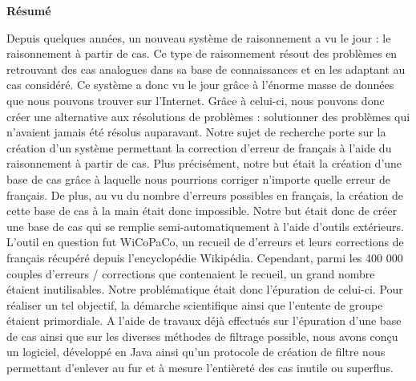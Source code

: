 \documentclass[11pt]{article}
\begin{document}
\cleardoublepage
\newpage
\strut
\thispagestyle{empty}
\newpage

\begin{center}
{\bfseries \huge R\'{e}sum\'{e}}
\end{center}
\vspace*{35mm}
Depuis quelques ann\'{e}es, un nouveau syst\`{e}me de raisonnement a vu le jour : le raisonnement \`{a} partir de cas. Ce type de raisonnement r\'{e}sout des probl\`{e}mes en retrouvant des cas analogues dans sa base de connaissances et en les adaptant au cas consid\'{e}r\'{e}. Ce syst\`{e}me a donc vu le jour gr\^{a}ce \`{a} l'\'{e}norme masse de donn\'{e}es que nous pouvons trouver sur l'Internet. Gr\^{a}ce \`{a} celui-ci, nous pouvons donc cr\'{e}er une alternative aux r\'{e}solutions de probl\`{e}mes : solutionner des probl\`{e}mes qui n'avaient jamais \'{e}t\'{e} r\'{e}solus auparavant. Notre sujet de recherche porte sur la cr\'{e}ation d'un syst\`{e}me permettant la correction d'erreur de fran\c{c}ais \`{a} l'aide du raisonnement \`{a} partir de cas. Plus pr\'{e}cis\'{e}ment, notre but \'{e}tait la cr\'{e}ation d'une base de cas gr\^{a}ce \`{a} laquelle nous pourrions corriger n'importe quelle erreur de fran\c{c}ais. De plus, au vu du nombre d'erreurs possibles en fran\c{c}ais, la cr\'{e}ation de cette base de cas \`{a} la main \'{e}tait donc impossible. Notre but \'{e}tait donc de cr\'{e}er une base de cas qui se remplie semi-automatiquement \`{a} l'aide d'outils ext\'{e}rieurs. L'outil en question fut WiCoPaCo, un recueil de d'erreurs et leurs corrections de fran\c{c}ais r\'{e}cup\'{e}r\'{e} depuis l'encyclop\'{e}die Wikip\'{e}dia. Cependant, parmi les 400 000 couples d'erreurs / corrections que contenaient le recueil, un grand nombre \'{e}taient inutilisables. Notre probl\'{e}matique \'{e}tait donc l'\'{e}puration de celui-ci. Pour r\'{e}aliser un tel objectif, la d\'{e}marche scientifique ainsi que l'entente de groupe \'{e}taient primordiale. A l'aide de travaux d\'{e}j\`{a} effectu\'{e}s sur l'\'{e}puration d'une base de cas ainsi que sur les diverses m\'{e}thodes de filtrage possible, nous avons con\c{c}u un logiciel, d\'{e}velopp\'{e} en Java ainsi qu'un protocole de cr\'{e}ation de filtre nous permettant d'enlever au fur et \`{a} mesure l'enti\`{e}ret\'{e} des cas inutile ou superflus. 
\newline
\newline
\end{document}
